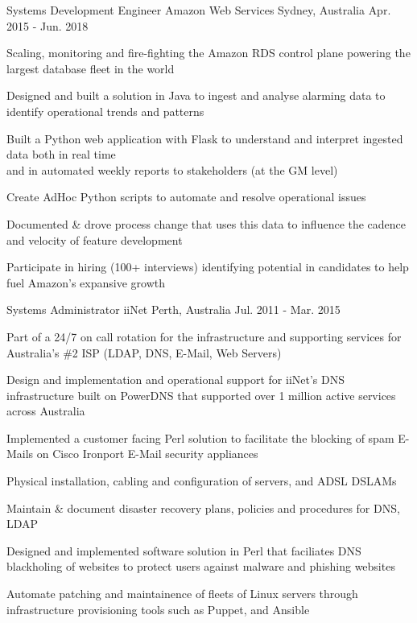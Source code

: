 \begin{cventries}
  \cventry
    {Systems Development Engineer} %
    {Amazon Web Services} %
    {Sydney, Australia} %
    {Apr. 2015 - Jun. 2018} %
    {
      \begin{cvitems} %
        \item {Scaling, monitoring and fire-fighting the Amazon RDS control plane powering the largest database fleet in the world}
        \item {Designed and built a solution in Java to ingest and analyse alarming data to identify operational trends and patterns }
        \item {Built a Python web application with Flask to understand and interpret ingested data both in real time\\
        and in automated weekly reports to stakeholders (at the GM level)}
        \item {Create AdHoc Python scripts to automate and resolve operational issues}
        \item {Documented \& drove process change that uses this data to influence the cadence and velocity of feature development }
        \item {Participate in hiring (100+ interviews) identifying potential in candidates to help fuel Amazon's expansive growth}
      \end{cvitems}
    }

  \cventry
    {Systems Administrator} %
    {iiNet} %
    {Perth, Australia} %
    {Jul. 2011 - Mar. 2015} %
    {
      \begin{cvitems}
        \item {Part of a 24/7 on call rotation for the infrastructure and supporting services for Australia's \#2 ISP (LDAP, DNS, E-Mail, Web Servers)}
        \item {Design and implementation and operational support for iiNet's DNS infrastructure built on PowerDNS that supported over 1 million active services across Australia}
        \item {Implemented a customer facing Perl solution to facilitate the blocking of spam E-Mails on Cisco Ironport E-Mail security appliances}
        \item {Physical installation, cabling and configuration of servers, and ADSL DSLAMs}
        \item {Maintain \& document disaster recovery plans, policies and procedures for DNS, LDAP}
        \item {Designed and implemented software solution in Perl that faciliates DNS blackholing of websites to protect users against malware and phishing websites}
        \item {Automate patching and maintainence of fleets of Linux servers through infrastructure provisioning tools such as Puppet, and Ansible}
      \end{cvitems}
    }
\end{cventries}
